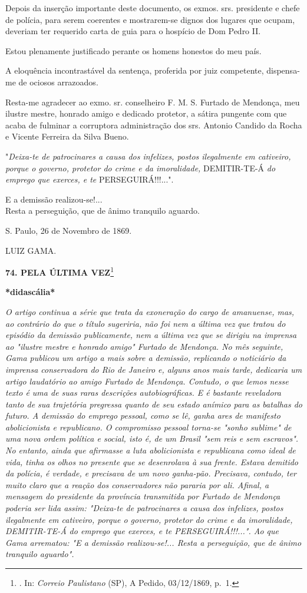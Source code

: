 Depois da inserção importante deste documento, os exmos. srs. presidente
e chefe de polícia, para serem coerentes e mostrarem-se dignos dos
lugares que ocupam, deveriam ter requerido carta de guia para o hospício
de Dom Pedro II.

Estou plenamente justificado perante os homens honestos do meu país.

A eloquência incontrastável da sentença, proferida por juiz competente,
dispensa-me de ociosos arrazoados.

Resta-me agradecer ao exmo. sr. conselheiro F. M. S. Furtado de
Mendonça, meu ilustre mestre, honrado amigo e dedicado protetor, a
sátira pungente com que acaba de fulminar a corruptora administração dos
srs. Antonio Candido da Rocha e Vicente Ferreira da Silva Bueno.

"\emph{Deixa-te de patrocinares a causa dos infelizes, postos
ilegalmente em cativeiro, porque o governo, protetor do crime e da
imoralidade,} DEMITIR-TE-Á \emph{do emprego que exerces, e te}
PERSEGUIRÁ!!!...".

E a demissão realizou-se!...\\
Resta a perseguição, que de ânimo tranquilo aguardo.

S. Paulo, 26 de Novembro de 1869.

LUIZ GAMA.

\textbf{74. PELA ÚLTIMA VEZ}\footnote{. In: \emph{Correio Paulistano}
  (SP), A Pedido, 03/12/1869, p.~1.}

\textbf{*didascália*}

\emph{O artigo continua a série que trata da exoneração do cargo de
amanuense, mas, ao contrário do que o título sugeriria, não foi nem a
última vez que tratou do episódio da demissão publicamente, nem a última
vez que se dirigiu na imprensa ao "ilustre mestre e honrado amigo"
Furtado de Mendonça. No mês seguinte, Gama publicou um artigo a mais
sobre a demissão, replicando o noticiário da imprensa conservadora do
Rio de Janeiro e, alguns anos mais tarde, dedicaria um artigo laudatório
ao amigo Furtado de Mendonça. Contudo, o que lemos nesse texto é uma de
suas raras descrições autobiográficas. E é bastante reveladora tanto de
sua trajetória pregressa quanto de seu estado anímico para as batalhas
do futuro. A demissão do emprego pessoal, como se lê, ganha ares de
manifesto abolicionista e republicano. O compromisso pessoal torna-se
"sonho sublime" de uma nova ordem política e social, isto é, de um
Brasil "sem reis e sem escravos". No entanto, ainda que afirmasse a luta
abolicionista e republicana como ideal de vida, tinha os olhos no
presente que se desenrolava à sua frente. Estava demitido da polícia, é
verdade, e precisava de um novo ganha-pão. Precisava, contudo, ter muito
claro que a reação dos conservadores não pararia por ali. Afinal, a
mensagem do presidente da província transmitida por Furtado de Mendonça
poderia ser lida assim: "Deixa-te de patrocinares a causa dos infelizes,
postos ilegalmente em cativeiro, porque o governo, protetor do crime e
da imoralidade, DEMITIR-TE-Á do emprego que exerces, e te
PERSEGUIRÁ!!!...". Ao que Gama arrematou: "E a demissão realizou-se!...
Resta a perseguição, que de ânimo tranquilo aguardo".}

